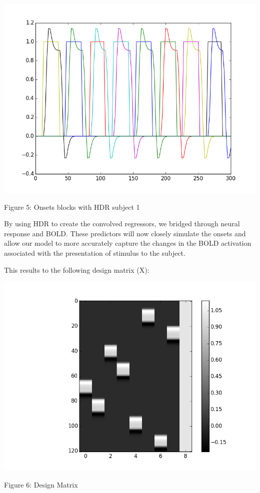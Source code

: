 \documentclass[12pt]{article}
\begin{document}
\begin{housevseverything}
    \centering
      \includegraphics[width=1\textwidth]{block_and_hdr}
    \caption{Figure 5: Onsets blocks with HDR subject 1}
\end{housevseverything}



    

By using HDR to create the convolved regressors, we bridged through neural 
response and BOLD. These predictors will now closely simulate the onsets and 
allow our model to more accurately capture the changes in the BOLD activation 
associated with the presentation of stimulus to the subject.

This results to the following design matrix (X):

\begin{housevseverything}
    \centering
      \includegraphics[width=1\textwidth]{desing_matrix}
    \caption{Figure 6: Design Matrix}
\end{housevseverything}
\end{document}
